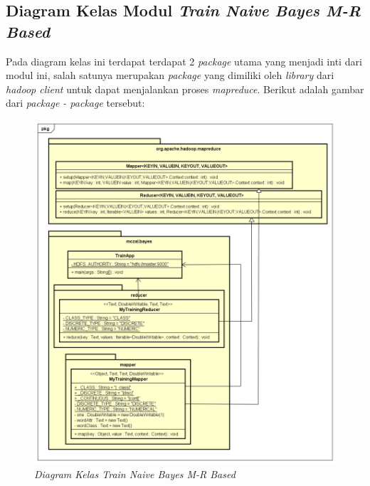 \subsection{Diagram Kelas Modul \textit{Train Naive Bayes M-R Based}}
Pada diagram kelas ini terdapat terdapat 2 \textit{package} utama yang menjadi inti dari modul ini, salah satunya merupakan \textit{package} yang dimiliki oleh \textit{library} dari \textit{hadoop client} untuk dapat menjalankan proses \textit{mapreduce}. Berikut adalah gambar dari \textit{package - package} tersebut:
\begin{figure}[H]
	\centering
	\includegraphics[scale=0.6]{ClassDiagramLengkap/CD_Train_MR}
	\caption[Diagram Kelas \textit{Train Naive Bayes M-R Based}]{\textit{Diagram Kelas Train Naive Bayes M-R Based}}
	\label{fig:Diagram Kelas Modul Kelola Input}
\end{figure}

